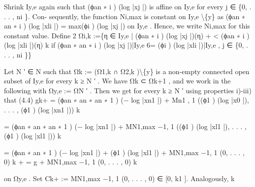 \documentclass[
  10pt,
]{article}
\newenvironment{Shaded}{}{}
\newcommand{\NormalTok}[1]{#1}
\begin{document}
\begin{Shaded}
\begin{Highlighting}[]
\NormalTok{Shrink Iy,e again such that (ϕan   ∗}
\NormalTok{                                i ) (log |xj |) is affine on Iy,e for every j ∈ \{0, . . . , ni \}. Con{-}}
\NormalTok{sequently, the function Ni,max is constant on Iy,e \textbackslash{}\{y\} as (ϕan       ∗                         an ∗}
\NormalTok{                                                                  i ) (log |xli |) = max(ϕi ) (log |xj |)}
\NormalTok{on Iy,e . Hence, we write Ni,max for this constant value.}
\NormalTok{   Define}
\NormalTok{                                                       2}
\NormalTok{          Ωi,k :=\{η ∈ Iy,e | (ϕan  ∗}
\NormalTok{                               i ) (log |xj |)(η) +      \textless{} (ϕan   ∗}
\NormalTok{                                                              i ) (log |xli |)(η)}
\NormalTok{                                                       k}
\NormalTok{                   if (ϕan  ∗                      an ∗}
\NormalTok{                        i ) (log |xj |)|Iy,e 6= (ϕi ) (log |xli |)|Iy,e , j ∈ \{0, . . . , ni \}\}}

\NormalTok{Let N ′ ∈ N such that Ωk := (Ω1,k ∩ Ω2,k )\textbackslash{}\{y\} is a non{-}empty connected open subset}
\NormalTok{of Iy,e for every k ≥ N ′ . We have Ωk ⊂ Ωk+1 , and we work in the following with}
\NormalTok{Ωy,e := ΩN ′ . Then we get for every k ≥ N ′ using properties i){-}iii) that}
\NormalTok{(4.4)    gk+ = (ϕan ∗                            an ∗                       an ∗}
\NormalTok{                 1 ) (− log |xn1 |) + Mn1 , 1 ((ϕ1 ) (log |x0 |), . . . , (ϕ1 ) (log |xn1 |))}
\NormalTok{                                                 k}

\NormalTok{            = (ϕan ∗                                  an ∗                        an ∗}
\NormalTok{                1 ) (− log |xn1 |) + MN1,max −1, 1 ((ϕ1 ) (log |xl1 |), . . . , (ϕ1 ) (log |xl1 |))}
\NormalTok{                                                           k}

\NormalTok{            = (ϕan ∗                   an ∗}
\NormalTok{                1 ) (− log |xn1 |) + (ϕ1 ) (log |xl1 |) + MN1,max −1, 1 (0, . . . , 0)}
\NormalTok{                                                                                k}
\NormalTok{                 +}
\NormalTok{            = g + MN1,max −1, 1 (0, . . . , 0)}
\NormalTok{                                   k}

\NormalTok{on Ωy,e . Set Ck+ := MN1,max −1, 1 (0, . . . , 0) ∈ [0, k1 ]. Analogously,}
\NormalTok{                                 k}


\end{Highlighting}
\end{Shaded}
\end{document}
